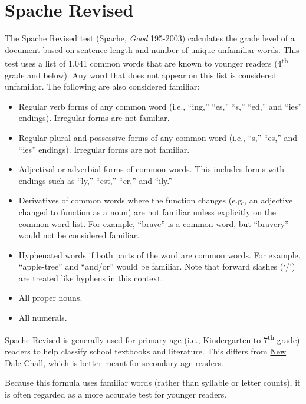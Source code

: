 \documentclass[
]{book}
\providecommand{\tightlist}{%
  \setlength{\itemsep}{0pt}\setlength{\parskip}{0pt}}
\theoremstyle{definition}
\theoremstyle{definition}
\theoremstyle{definition}
\theoremstyle{definition}
\theoremstyle{remark}
\begin{document}
\hypertarget{spache-test}{%
\section{\texorpdfstring{Spache Revised}{Spache Revised}}\label{spache-test}}

The Spache Revised test (Spache, \emph{Good} 195-2003) calculates the grade level of a document based on sentence length and number of unique unfamiliar words. This test uses a list of 1,041 common words that are known to younger readers (4\textsuperscript{th} grade and below). Any word that does not appear on this list is considered unfamiliar. The following are also considered familiar:

\begin{itemize}
\tightlist
\item
  Regular verb forms of any common word (i.e., ``ing,'' ``es,'' ``s,'' ``ed,'' and ``ies'' endings). Irregular forms are not familiar.
\item
  Regular plural and possessive forms of any common word (i.e., ``s,'' ``es,'' and ``ies'' endings). Irregular forms are not familiar.
\item
  Adjectival or adverbial forms of common words. This includes forms with endings such as ``ly,'' ``est,'' ``er,'' and ``ily.''
\item
  Derivatives of common words where the function changes (e.g., an adjective changed to function as a noun) are not familiar unless explicitly on the common word list. For example, ``brave'' is a common word, but ``bravery'' would not be considered familiar.
\item
  Hyphenated words if both parts of the word are common words. For example, ``apple-tree'' and ``and/or'' would be familiar. Note that forward slashes (`/') are treated like hyphens in this context.
\item
  All proper nouns.
\item
  All numerals.
\end{itemize}

Spache Revised is generally used for primary age (i.e., Kindergarten to 7\textsuperscript{th} grade) readers to help classify school textbooks and literature. This differs from \protect\hyperlink{dale-chall-test}{New Dale-Chall}, which is better meant for secondary age readers.

Because this formula uses familiar words (rather than syllable or letter counts), it is often regarded as a more accurate test for younger readers.
\end{document}
